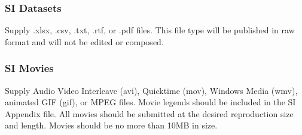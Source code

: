 \documentclass[9pt,twocolumn,twoside]{pnas-new}
\begin{document}
\subsubsection*{SI Datasets}

Supply .xlsx, .csv, .txt, .rtf, or .pdf files. This file type will be published in raw format and will not be edited or composed.


\subsubsection*{SI Movies}

Supply Audio Video Interleave (avi), Quicktime (mov), Windows Media (wmv), animated GIF (gif), or MPEG files. Movie legends should be included in the SI Appendix file. All movies should be submitted at the desired reproduction size and length. Movies should be no more than 10MB in size.





\showmatmethods{} %


\showacknow{} %


\bibsplit[2]


\end{document}
